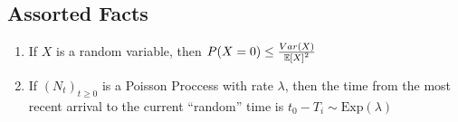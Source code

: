 \subsection*{Assorted Facts}
\begin{enumerate}
	\item If $X$ is a random variable, then $P(X=0) \leq \frac{Var\left(X\right)}{\mathbb{E}\left[X\right]^2}$
	\item If $(N_t)_{t\geq0}$ is a Poisson Proccess with rate $\lambda$, then the time from the most recent arrival to the current ``random'' time is $t_0 - T_i \sim \text{Exp}(\lambda)$
\end{enumerate}

